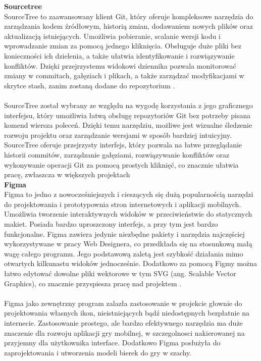 \documentclass[twoside]{projektInzynierskiMS1}
\begin{document}
\newpage

\noindent \textbf{Sourcetree}\\
SourceTree to zaawansowany klient Git, który oferuje kompleksowe narzędzia do zarządzania kodem źródłowym, historią zmian, dodawaniem nowych plików oraz aktualizacją istniejących. Umożliwia pobieranie, scalanie wersji kodu i wprowadzanie zmian za pomocą jednego kliknięcia. Obsługuje duże pliki bez konieczności ich dzielenia, a także ułatwia identyfikowanie i rozwiązywanie konfliktów. Dzięki przejrzystemu widokowi dziennika pozwala monitorować zmiany w commitach, gałęziach i plikach, a także zarządzać modyfikacjami w skrytce stash, zanim zostaną dodane do repozytorium \cite{SourceTree}.
\\\\
SourceTree został wybrany ze względu na wygodę korzystania z jego graficznego interfejsu, który umożliwia łatwą obsługę repozytoriów Git bez potrzeby pisana komend wiersza poleceń. Dzięki temu narzędziu, możliwe jest wizualne śledzenie rozwoju projektu oraz zarządzanie wersjami w sposób bardziej intuicyjny. SourceTree oferuje przejrzysty interfejs, który pozwala na łatwe przeglądanie historii commitów, zarządzanie gałęziami, rozwiązywanie konfliktów oraz wykonywanie operacji Git za pomocą prostych kliknięć, co znacznie ułatwia pracę, zwłaszcza w większych projektach
\\

\noindent \textbf{Figma}\\
Figma to jedno z nowocześniejszych i cieszących się dużą popularnością narzędzi do projektowania i prototypownia stron internetowych i aplikacji mobilnych. Umożliwia tworzenie interaktywnych widoków w przeciwieństwie do statycznych makiet. Posiada bardzo uproszczony interfejs, a przy tym jest bardzo funkcjonalne. Figma zawiera jedynie niezbędne pakiety i narzędzia najczęściej wykorzystywane w pracy Web Designera, co przedkłada się na stosunkową małą wagę całego programu. Jego podstawową zaletą jest szybkość działania mimo otwartych kilkunastu widoków jednocześnie. Dodatkowo za pomocą Figmy można łatwo edytować dowolne pliki wektorowe w tym SVG (ang. Scalable Vector Graphics), co znacznie przyspiesza pracę nad projektem \cite{BoringOwlFigma}.
\\\\
Figma jako zewnętrzny program zalazła zastosowanie w projekcie głownie do projektowania własnych ikon, nieistniejących bądź niedostępnych bezpłatnie na internecie. Zastosowanie prostego, ale bardzo efektywnego narzędzia ma duże znaczenie dla rozwoju aplikacji gry mobilnej, w szczegolnosci nakierowanej na przyjemny dla użytkownika interface. Dodatkowo Figma posłużyła do zaprojektowania i utworzenia modeli bierek do gry w szachy.  
\end{document}
